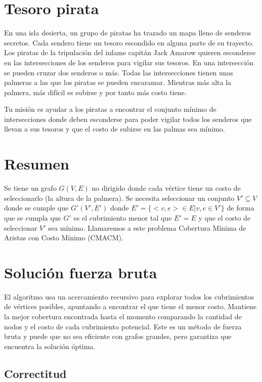 \documentclass{article}
\begin{document}
\section*{Tesoro pirata}

En una isla desierta, un grupo de piratas ha trazado un mapa lleno de senderos secretos. Cada sendero tiene un tesoro escondido en alguna parte de su trayecto. Los piratas de la tripulación del infame capitán Jack Amarow quieren esconderse en las intersecciones de los senderos para vigilar sus tesoros. En una intersección se pueden cruzar dos senderos o más. Todas las intersecciones tienen unas palmeras a las que los piratas se pueden encaramar. Mientras más alta la palmera, más difícil es subirse y por tanto más costo tiene.

Tu misión es ayudar a los piratas a encontrar el conjunto mínimo de intersecciones donde deben esconderse para poder vigilar todos los senderos que llevan a sus tesoros y que el costo de subirse en las palmas sea mínimo.

\section*{Resumen}

Se tiene un grafo $G(V,E)$ no dirigido donde cada vértice tiene un costo de seleccionarlo (la altura de la palmera). Se necesita seleccionar un conjunto $V' \subseteq V$ donde se cumple que $G'(V',E')$ donde $E'=\{<v,e> \in E | v,e \in V'\}$ de forma que se cumpla que $G'$ es el cubrimiento menor tal que $E' = E$ y que el costo de seleccionar $V'$ sea mínimo. Llamaremos a este problema Cobertura Mínima de Aristas con Costo Mínimo (CMACM).

\section*{Solución fuerza bruta}

El algoritmo usa un acercamiento recursivo para explorar todos los cubrimientos de vértices posibles, apuntando a encontrar el que tiene el menor costo. Mantiene la mejor cobertura encontrada hasta el momento comparando la cantidad de nodos y el costo de cada cubrimiento potencial. Este es un método de fuerza bruta y puede que no sea eficiente con grafos grandes, pero garantiza que encuentra la solución óptima.

\subsection*{Correctitud}
\end{document}
